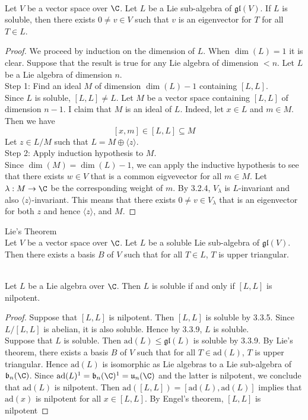 \documentclass[a4paper]{article}
\begin{document}
\begin{prp}{}{} \\Let $V$ be a vector space over $\C$. Let $L$ be a Lie sub-algebra of $\mathfrak{gl}(V)$. If $L$ is soluble, then there exists $0\neq v\in V$ such that $v$ is an eigenvector for $T$ for all $T\in L$. 
\begin{proof}
We proceed by induction on the dimension of $L$. When $\dim(L)=1$ it is clear. Suppose that the result is true for any Lie algebra of dimension $<n$. Let $L$ be a Lie algebra of dimension $n$. \\

Step 1: Find an ideal $M$ of dimension $\dim(L)-1$ containing $[L,L]$. \\
Since $L$ is soluble, $[L,L]\neq L$. Let $M$ be a vector space containing $[L,L]$ of dimension $n-1$. I claim that $M$ is an ideal of $L$. Indeed, let $x\in L$ and $m\in M$. Then we have $$[x,m]\in [L,L]\subseteq M$$ Let $z\in L/M$ such that $L=M\oplus\langle z\rangle$. \\

Step 2: Apply induction hypothesis to $M$. \\
Since $\dim(M)=\dim(L)-1$, we can apply the inductive hypothesis to see that there exists $w\in V$ that is a common eigvevector for all $m\in M$. Let $\lambda:M\to\C$ be the corresponding weight of $m$. By 3.2.4, $V_\lambda$ is $L$-invariant and also $\langle z\rangle$-invariant. This means that there exists $0\neq v\in V_\lambda$ that is an eigenvector for both $z$ and hence $\langle z\rangle$, and $M$. 
\end{proof}
\end{prp}

\begin{thm}{Lie's Theorem}{} \\Let $V$ be a vector space over $\C$. Let $L$ be a soluble Lie sub-algebra of $\mathfrak{gl}(V)$. Then there exists a basis $B$ of $V$ such that for all $T\in L$, $T$ is upper triangular. 
\end{thm}

\begin{prp}{}{} \\Let $L$ be a Lie algebra over $\C$. Then $L$ is soluble if and only if $[L,L]$ is nilpotent. 
\begin{proof}
Suppose that $[L,L]$ is nilpotent. Then $[L,L]$ is soluble by 3.3.5. Since $L/[L,L]$ is abelian, it is also soluble. Hence by 3.3.9, $L$ is soluble. \\

Suppose that $L$ is soluble. Then $\text{ad}(L)\leq\mathfrak{gl}(L)$ is soluble by 3.3.9. By Lie's theorem, there exists a basis $B$ of $V$ such that for all $T\in\text{ad}(L)$, $T$ is upper triangular. Hence $\text{ad}(L)$ is isomorphic as Lie algebras to a Lie sub-algebra of $\mathfrak{b}_n(\C)$. Since $\text{ad}(L)^1=\mathfrak{b}_n(\C)^1=\mathfrak{u}_n(\C)$ and the latter is nilpotent, we conclude that $\text{ad}(L)$ is nilpotent. Then $\text{ad}([L,L])=[\text{ad}(L),\text{ad}(L)]$ implies that $\text{ad}(x)$ is nilpotent for all $x\in [L,L]$. By Engel's theorem, $[L,L]$ is nilpotent
\end{proof}
\end{prp}
\end{document}
